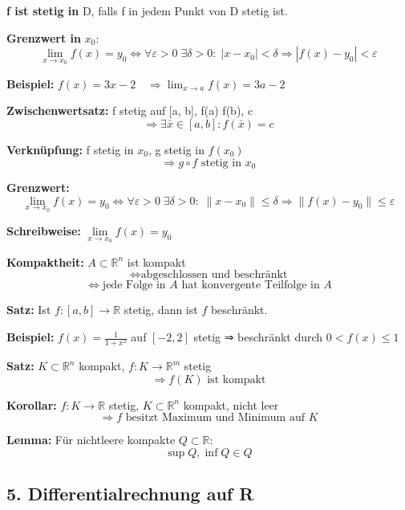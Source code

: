 \textbf{f ist stetig in } D, falls f in jedem Punkt von D stetig ist.

\textbf{Grenzwert in } $x_0$:  
\[
\lim_{x \to x_0} f(x) = y_0 \Leftrightarrow
\forall \varepsilon > 0\; \exists \delta > 0:\; |x - x_0| < \delta \Rightarrow |f(x) - y_0| < \varepsilon
\]

\textbf{Beispiel:}  
$f(x) = 3x - 2 \quad \Rightarrow \lim_{x \to a} f(x) = 3a - 2$

\textbf{Zwischenwertsatz:}  
f stetig auf [a, b],\; f(a) \leq f(b),\; c \in [f(a), f(b)]  
\[
\Rightarrow \exists \bar{x} \in [a, b]: f(\bar{x}) = c
\]

\textbf{Verknüpfung:}  
f stetig in \( x_0 \),\; g stetig in \( f(x_0) \)  
\[
\Rightarrow g \circ f \text{ stetig in } x_0
\]

\textbf{Grenzwert:}  
\[
\lim_{x \to x_0} f(x) = y_0 \Leftrightarrow
\forall \varepsilon > 0\; \exists \delta > 0:\;
\|x - x_0\| \leq \delta \Rightarrow \|f(x) - y_0\| \leq \varepsilon
\]

\textbf{Schreibweise:}  
\( \lim\limits_{x \to x_0} f(x) = y_0 \)

\textbf{Kompaktheit:}  
\( A \subset \mathbb{R}^n \) ist kompakt  
\[
\Leftrightarrow \text{abgeschlossen und beschränkt}
\]
\[
\Leftrightarrow \text{jede Folge in } A \text{ hat konvergente Teilfolge in } A
\]

\textbf{Satz:}  
Ist \( f: [a,b] \to \mathbb{R} \) stetig, dann ist \( f \) beschränkt.

\textbf{Beispiel:}  
\( f(x) = \frac{1}{1 + x^2} \) auf \( [-2, 2] \) stetig ⇒ beschränkt durch \( 0 < f(x) \leq 1 \)

\textbf{Satz:}  
\( K \subset \mathbb{R}^n \) kompakt,\; \( f: K \to \mathbb{R}^m \) stetig  
\[
\Rightarrow f(K) \text{ ist kompakt}
\]


\textbf{Korollar:}  
\( f: K \to \mathbb{R} \) stetig, \( K \subset \mathbb{R}^n \) kompakt, nicht leer  
\[
\Rightarrow f \text{ besitzt Maximum und Minimum auf } K
\]


\textbf{Lemma:}  
Für nichtleere kompakte \( Q \subset \mathbb{R} \):  
\[
\sup Q, \inf Q \in Q
\]

\subsection{5. Differentialrechnung auf R}

